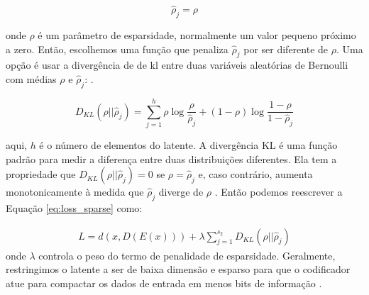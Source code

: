\begin{equation}
\hat{\rho}_{j} = \rho
\end{equation}

\noindent onde ${\rho}$ é um parâmetro de esparsidade, normalmente um valor pequeno próximo a zero. 
Então, escolhemos uma função que penaliza $\hat{\rho}_{j}$ por ser diferente de ${\rho}$. Uma opção é usar a divergência de 
de \gls{kl} \cite{kullback1951information} entre duas variáveis aleatórias de Bernoulli com médias ${\rho}$ e $\hat{\rho}_{j}$: \cite{ng2011sparse}.  

\begin{equation}
D_{KL}(\rho||\hat{\rho}_{j}) = \sum_{j=1}^{h}\rho \log \frac{\rho}{\hat{\rho}_{j}} +(1-\rho)\log \frac{1- \rho}{1-\hat{\rho}_j}
\end{equation}

\noindent aqui, $h$ é o número de elementos do latente.  A divergência KL é uma função padrão para medir a diferença entre duas distribuições diferentes. Ela tem a propriedade que $D_{KL}(\rho||\hat{\rho}_{j}) = 0$ se $\rho = \hat{\rho}_{j}$ e, caso contrário, aumenta monotonicamente à medida que $\hat{\rho}_{j}$ diverge de $\rho$ \cite{kullback1951information}. Então podemos reescrever a Equação \ref{eq:loss_sparse} como:

\begin{equation}
\label{eq:loss_sparse2}
\begin{aligned}
L = d({x},D(E({x}))) + \lambda \sum_{j=1}^{s_2} D_{KL}(\rho||\hat{\rho}_{j}) 
\end{aligned}
\end{equation}
\noindent onde $\lambda$ controla o peso do termo de penalidade de esparsidade. Geralmente, restringimos o latente a ser de baixa dimensão e esparso para que o codificador atue para compactar os dados de entrada em menos bits de informação \cite{FrancoisDeepLearning}.





